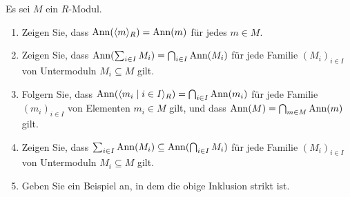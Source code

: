 \begin{question}[subtitle = Rechenregeln für Annihilatoren]
  \label{question: rules for annihilators}
  Es sei $M$ ein $R$-Modul.
  \begin{enumerate}
    \item
      Zeigen Sie, dass $\operatorname{Ann}( \langle m\rangle_R ) = \operatorname{Ann}(m)$ für jedes $m \in M$.
    \item
      Zeigen Sie, dass $\operatorname{Ann}( \sum_{i \in I} M_i) = \bigcap_{i \in I} \operatorname{Ann}(M_i)$ für jede Familie $(M_i)_{i \in I}$ von Untermoduln $M_i \subseteq M$ gilt.
    \item
      Folgern Sie, dass $\operatorname{Ann}( \langle m_i \mid i \in I\rangle_R ) = \bigcap_{i \in I} \operatorname{Ann}(m_i)$ für jede Familie $(m_i)_{i \in I}$ von Elementen $m_i \in M$ gilt, und dass $\operatorname{Ann}(M) = \bigcap_{m \in M} \operatorname{Ann}(m)$ gilt.
    \item
      Zeigen Sie, dass $\sum_{i \in I} \operatorname{Ann}(M_i) \subseteq \operatorname{Ann}( \bigcap_{i \in I} M_i)$ für jede Familie $(M_i)_{i \in I}$ von Untermoduln $M_i \subseteq M$ gilt.
    \item
      Geben Sie ein Beispiel an, in dem die obige Inklusion strikt ist.
  \end{enumerate}
\end{question}


